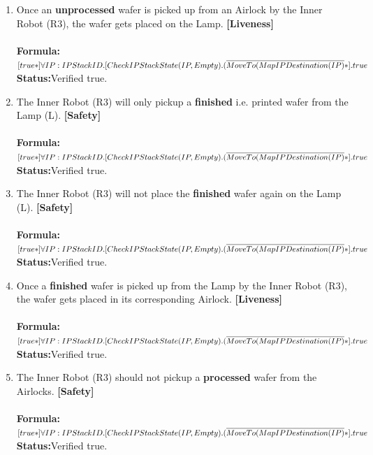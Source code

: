 \documentclass[a4paper,12pt]{article}
\begin{document}
\begin{enumerate}
\item Once an \textbf{unprocessed} wafer is picked up from an Airlock by the Inner Robot (R3), the wafer gets placed on the Lamp. \textbf{[Liveness]}
\\
\\\textbf{Formula:} $[true*] \forall IP: IPStackID.[CheckIPStackState(IP, Empty).
\\(\overline{MoveTo(MapIPDestination(IP)}*].true$ \\\textbf{Status:}Verified true.

\item The Inner Robot (R3) will only pickup a \textbf{finished} i.e. printed wafer from the Lamp (L). \textbf{[Safety]}
\\
\\\textbf{Formula:} $[true*] \forall IP: IPStackID.[CheckIPStackState(IP, Empty).
\\(\overline{MoveTo(MapIPDestination(IP)}*].true$ \\\textbf{Status:}Verified true.

\item The Inner Robot (R3) will not place the \textbf{finished} wafer again on the Lamp (L). \textbf{[Safety]}
\\
\\\textbf{Formula:} $[true*] \forall IP: IPStackID.[CheckIPStackState(IP, Empty).
\\(\overline{MoveTo(MapIPDestination(IP)}*].true$ \\\textbf{Status:}Verified true.

\item Once a \textbf{finished} wafer is picked up from the Lamp by the Inner Robot (R3), the wafer gets placed in its corresponding Airlock. \textbf{[Liveness]}
\\
\\\textbf{Formula:} $[true*] \forall IP: IPStackID.[CheckIPStackState(IP, Empty).
\\(\overline{MoveTo(MapIPDestination(IP)}*].true$ \\\textbf{Status:}Verified true.

\item The Inner Robot (R3) should not pickup a \textbf{processed} wafer from the Airlocks. \textbf{[Safety]}
\\
\\\textbf{Formula:} $[true*] \forall IP: IPStackID.[CheckIPStackState(IP, Empty).
\\(\overline{MoveTo(MapIPDestination(IP)}*].true$ \\\textbf{Status:}Verified true.


\end{enumerate}
\end{document}
